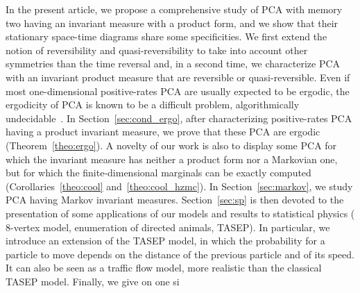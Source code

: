 \documentclass[AHL,Unicode,longabstracts]{cedram}
\newcounter{a}
\begin{document}
In the present article, we propose a comprehensive study of PCA with memory two having an invariant measure with a product form, and we show that their stationary space-time diagrams share some specificities. We first extend the notion of reversibility and quasi-reversibility to take into account other symmetries than the time reversal and, in a second time, we characterize PCA with an invariant product measure that are reversible or quasi-reversible. Even if most one-dimensional positive-rates PCA are usually expected to be ergodic, the ergodicity of PCA is known to be a difficult problem, algorithmically undecidable~\cite{bmm_aap,dobrushin}. In Section~\ref{sec:cond_ergo}, after characterizing positive-rates PCA having a product invariant measure, we prove that these PCA are ergodic (Theorem~\ref{theo:ergo}). A novelty of our work is also to display some PCA for which the invariant measure has neither a product form nor a Markovian one, but for which the finite-dimensional marginals can be exactly computed (Corollaries~\ref{theo:cool} and~\ref{theo:cool_hzmc}). In Section~\ref{sec:markov}, we study PCA having Markov invariant measures. Section~\ref{sec:sp} is then devoted to the presentation of some applications of our models and results to statistical physics ($8$-vertex model, enumeration of directed animals, TASEP). In particular, we introduce an extension of the TASEP model, in which the probability for a particle to move depends on the distance of the previous particle and of its speed. It can also be seen as a traffic flow model, more realistic than the classical TASEP model. Finally, we give on one si%
\end{document}
